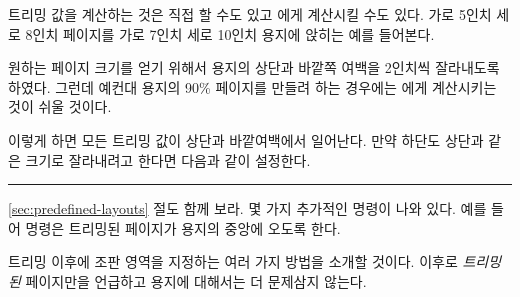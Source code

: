 트리밍 값을 계산하는 것은 직접 할 수도 있고 \ltx 에게 계산시킬 수도 있다.
가로 5인치 세로 8인치 페이지를 가로 7인치 세로 10인치 용지에 앉히는 예를 들어본다.
\begin{lcode}
\settrims{2in}{2in}
\end{lcode}
원하는 페이지 크기를 얻기 위해서 용지의 상단과 바깥쪽 여백을 2인치씩 잘라내도록
하였다.
그런데 예컨대 용지의 90\% 페이지를 만들려 하는 경우에는 \ltx 에게 계산시키는
것이 쉬울 것이다.
\begin{lcode}
\setlength{\trimtop}{\stockheight}    %
\addtolength{\trimtop}{-\paperheight}  %
\setlength{\trimedge}{\stockwidth}    %
\addtolength{\trimedge}{-\paperwidth} %
\end{lcode}
이렇게 하면 모든 트리밍 값이 상단과 바깥여백에서 일어난다.
만약 하단도 상단과 같은 크기로 잘라내려고 한다면 다음과 같이 설정한다.
\begin{lcode}
\settrims{0.5\trimtop}{\trimedge}
\end{lcode}

\fancybreak{}

\ref{sec:predefined-layouts} \emph{} 절도 함께 보라. 몇 가지 추가적인 명령이 나와 있다. 
예를 들어 \cmd{\setpagecc} 명령은 트리밍된 페이지가 용지의 중앙에 오도록 한다.

트리밍 이후에 조판 영역을 지정하는 여러 가지 방법을 소개할 것이다.
이후로 \emph{트리밍된} 페이지만을 언급하고 용지에 대해서는 더 문제삼지 않는다.

